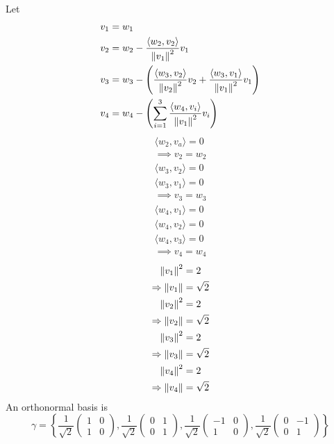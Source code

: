 \begin{enumerate}
\begin{align}
\end{align}
Let
\begin{align}
v_1 &= w_1\\
v_2 &= w_2 - \frac{\langle w_2,v_2\rangle}{\left\lVert v_1\right\rVert^2}v_1\\
v_3 &= w_3 - \left(\frac{\langle w_3,v_2\rangle}{\left\lVert v_2\right\rVert^2}v_2 +
  \frac{\langle w_3,v_1\rangle}{\left\lVert v_1\right\rVert^2}v_1\right)\\
v_4 &=  w_4 -\left(\sum\limits_{i=1}^3\frac{\langle w_4,v_i\rangle}{\left\lVert v_1\right\rVert^2}v_i\right)
\end{align}
\begin{gather}
\langle w_2,v_a \rangle = 0\\
\implies v_2 = w_2\\
\langle w_3,v_2\rangle = 0\\
\langle w_3,v_1\rangle = 0\\
\implies v_3 = w_3\\
\langle w_4,v_1 \rangle = 0\\
\langle w_4,v_2\rangle = 0\\
\langle w_4,v_3\rangle = 0\\
\implies v_4 = w_4
\end{gather}
\begin{gather}
\left\lVert v_1\right\rVert^2 = 2\\
\Rightarrow \left\lVert v_1\right\rVert = \sqrt{2}\\
\left\lVert v_2\right\rVert^2 = 2\\
\Rightarrow \left\lVert v_2\right\rVert = \sqrt{2}\\
\left\lVert v_3\right\rVert^2 = 2\\
\Rightarrow \left\lVert v_3\right\rVert = \sqrt{2}\\
\left\lVert v_4\right\rVert^2 = 2 \\
\Rightarrow \left\lVert v_4\right\rVert = \sqrt{2}
\end{gather}
An orthonormal basis is
\begin{equation}
\gamma =\left\{
\frac{1}{\sqrt{2}}
\begin{pmatrix}1&0\\1&0\end{pmatrix},
\frac{1}{\sqrt{2}}
\begin{pmatrix} 0 & 1\\ 0 & 1\end{pmatrix},
\frac{1}{\sqrt{2}}
\begin{pmatrix}-1&0\\1&0\end{pmatrix},
\frac{1}{\sqrt{2}}
\begin{pmatrix}0&-1\\0&1\end{pmatrix}
\right\}
\end{equation}
\end{enumerate}
